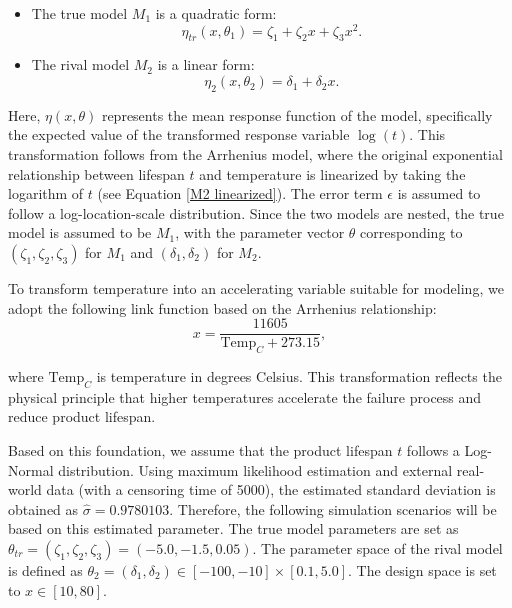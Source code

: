 \begin{itemize}
\item The true model $M_1$ is a quadratic form:
\begin{equation}\label{DeviceA_truemodel}
\eta_{tr}(x,\theta_1)=\zeta_1+\zeta_2x+\zeta_3x^2.
\end{equation}

\item The rival model $M_2$ is a linear form: 
\begin{equation}\label{DeviceA_rivalmodel}
\eta_{2}(x,\theta_2)=\delta_1+\delta_2x.
\end{equation}

\end{itemize}

\hspace*{8mm} Here, $\eta(x,\theta)$ represents the mean response function of the model, specifically the expected value of the transformed response variable $\log(t)$. This transformation follows from the Arrhenius model, where the original exponential relationship between lifespan $t$ and temperature is linearized by taking the logarithm of $t$ (see Equation \ref{M2 linearized}). The error term $\epsilon$ is assumed to follow a log-location-scale distribution. Since the two models are nested, the true model is assumed to be $M_1$, with the parameter vector $\theta$ corresponding to $(\zeta_1, \zeta_2, \zeta_3)$ for $M_1$ and $(\delta_1, \delta_2)$ for $M_2$.

\hspace*{8mm} To transform temperature into an accelerating variable suitable for modeling, we adopt the following link function based on the Arrhenius relationship:
\begin{equation}\label{link_function}
x = \frac{11605}{\text{Temp}_C + 273.15},
\end{equation}

where $\text{Temp}_C$ is temperature in degrees Celsius. This transformation reflects the physical principle that higher temperatures accelerate the failure process and reduce product lifespan.

\hspace*{8mm} Based on this foundation, we assume that the product lifespan $t$ follows a Log-Normal distribution. Using maximum likelihood estimation and external real-world data (with a censoring time of 5000), the estimated standard deviation is obtained as $\hat{\sigma} = 0.9780103$. Therefore, the following simulation scenarios will be based on this estimated parameter. The true model parameters are set as $\theta_{tr} = (\zeta_1, \zeta_2, \zeta_3) = (-5.0, -1.5, 0.05)$. The parameter space of the rival model is defined as $\theta_2 = (\delta_1, \delta_2) \in [-100, -10] \times [0.1, 5.0]$. The design space is set to $x \in [10, 80]$.


